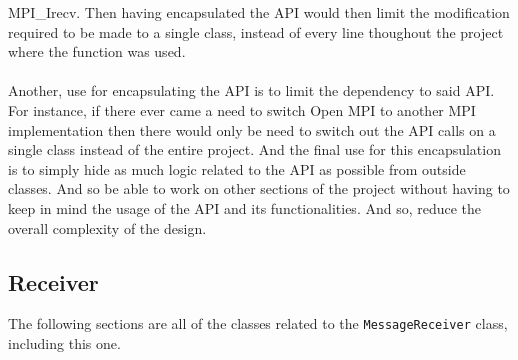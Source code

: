\documentclass[11pt]{article}
\begin{document}
MPI\_Irecv. Then having encapsulated the API would then limit the modification
required to be made to a single class, instead of every line thoughout the
project where the function was used.\\\\ Another, use for encapsulating
the API is to limit the dependency to said API. For instance, if there ever came
a need to switch Open MPI to another MPI implementation then there would only be
need to switch out the API calls on a single class instead of the entire
project. And the final use for this encapsulation is to simply hide as much
logic related to the API as possible from outside classes. And so be able to
work on other sections of the project without having to keep in mind the usage
of the API and its functionalities. And so, reduce the overall complexity of the
design.
\subsection{Receiver}
The following sections are all of the classes related to the
\texttt{MessageReceiver} class, including this one.
\end{document}
